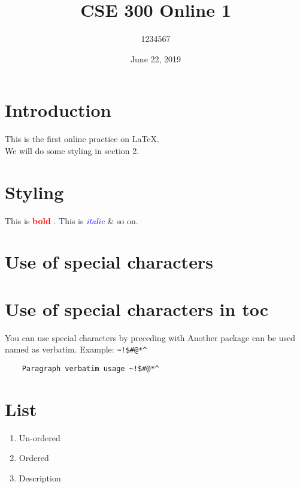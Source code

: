\documentclass{article}
\title{
CSE 300 Online 1\\
}
\author{1234567}
\date{June 22, 2019 }
\begin{document}
\maketitle

\tableofcontents

\section{Introduction}
This is the first online practice on \LaTeX. \\
We will do some styling in section 2.

\section{Styling}

This is \textcolor{red}{\textbf{bold}} . This
is \textcolor{blue}{\textit{italic}} \& so on.

\section*{Use of special characters}

\section*{Use of special characters in toc}

You can use special characters by preceding with \. Another package can be used named as verbatim. Example: \verb=~!$#@*^= %

\begin{verbatim}
    Paragraph verbatim usage ~!$#@*^
\end{verbatim}
\newpage
\section{List}
\begin{enumerate}[label= \roman*]
    \item Un-ordered 
    \item Ordered
    \item Description
\end{enumerate}
\end{document}
